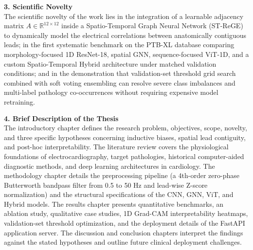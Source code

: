 \documentclass[12pt,a4paper]{article}
\begin{document}
\noindent
\textbf{3. Scientific Novelty} \\
The scientific novelty of the work lies in the integration of a learnable adjacency matrix $A \in \mathbb{R}^{12 \times 12}$ inside a Spatio-Temporal Graph Neural Network (ST-ReGE) to dynamically model the electrical correlations between anatomically contiguous leads; in the first systematic benchmark on the PTB-XL database comparing morphology-focused 1D ResNet-18, spatial GNN, sequence-focused ViT-1D, and a custom Spatio-Temporal Hybrid architecture under matched validation conditions; and in the demonstration that validation-set threshold grid search combined with soft voting ensembling can resolve severe class imbalances and multi-label pathology co-occurrences without requiring expensive model retraining.
\vspace{1em}

\noindent
\textbf{4. Brief Description of the Thesis} \\
The introductory chapter defines the research problem, objectives, scope, novelty, and three specific hypotheses concerning inductive biases, spatial lead contiguity, and post-hoc interpretability. The literature review covers the physiological foundations of electrocardiography, target pathologies, historical computer-aided diagnostic methods, and deep learning architectures in cardiology. The methodology chapter details the preprocessing pipeline (a 4th-order zero-phase Butterworth bandpass filter from 0.5 to 50 Hz and lead-wise Z-score normalization) and the structural specifications of the CNN, GNN, ViT, and Hybrid models. The results chapter presents quantitative benchmarks, an ablation study, qualitative case studies, 1D Grad-CAM interpretability heatmaps, validation-set threshold optimization, and the deployment details of the FastAPI application server. The discussion and conclusion chapters interpret the findings against the stated hypotheses and outline future clinical deployment challenges.
\vspace{1em}
\end{document}
